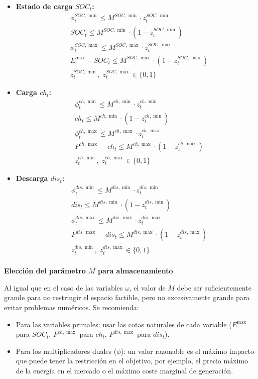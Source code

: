 \documentclass[a4paper,11pt]{article}
\begin{document}
\begin{itemize}
    \item \textbf{Estado de carga $SOC_t$:}
    \begin{align}
        &\phi_t^{SOC,\min} \leq M^{SOC,\min} \cdot z_t^{SOC,\min} \\
        &SOC_t \leq M^{SOC,\min} \cdot (1 - z_t^{SOC,\min}) \\
        &\phi_t^{SOC,\max} \leq M^{SOC,\max} \cdot z_t^{SOC,\max} \\
        &E^{\max} - SOC_t \leq M^{SOC,\max} \cdot (1 - z_t^{SOC,\max}) \\
        &z_t^{SOC,\min},\; z_t^{SOC,\max} \in \{0,1\}
    \end{align}
    \item \textbf{Carga $ch_t$:}
    \begin{align}
        &\phi_t^{ch,\min} \leq M^{ch,\min} \cdot z_t^{ch,\min} \\
        &ch_t \leq M^{ch,\min} \cdot (1 - z_t^{ch,\min}) \\
        &\phi_t^{ch,\max} \leq M^{ch,\max} \cdot z_t^{ch,\max} \\
        &P^{ch,\max} - ch_t \leq M^{ch,\max} \cdot (1 - z_t^{ch,\max}) \\
        &z_t^{ch,\min},\; z_t^{ch,\max} \in \{0,1\}
    \end{align}
    \item \textbf{Descarga $dis_t$:}
    \begin{align}
        &\phi_t^{dis,\min} \leq M^{dis,\min} \cdot z_t^{dis,\min} \\
        &dis_t \leq M^{dis,\min} \cdot (1 - z_t^{dis,\min}) \\
        &\phi_t^{dis,\max} \leq M^{dis,\max} \cdot z_t^{dis,\max} \\
        &P^{dis,\max} - dis_t \leq M^{dis,\max} \cdot (1 - z_t^{dis,\max}) \\
        &z_t^{dis,\min},\; z_t^{dis,\max} \in \{0,1\}
    \end{align}
\end{itemize}

\paragraph{}
\textbf{Elección del parámetro $M$ para almacenamiento}

Al igual que en el caso de las variables $\omega$, el valor de $M$ debe ser suficientemente grande para no restringir el espacio factible, pero no excesivamente grande para evitar problemas numéricos. Se recomienda:
\begin{itemize}
    \item Para las variables primales: usar las cotas naturales de cada variable ($E^{\max}$ para $SOC_t$, $P^{ch,\max}$ para $ch_t$, $P^{dis,\max}$ para $dis_t$).
    \item Para los multiplicadores duales ($\phi$): un valor razonable es el máximo impacto que puede tener la restricción en el objetivo, por ejemplo, el precio máximo de la energía en el mercado o el máximo coste marginal de generación.
\end{itemize}
\end{document}
